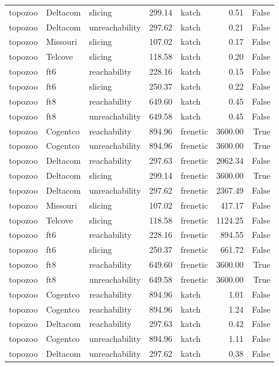 \begin{tabular}{lllrlrr}
topozoo & Deltacom & slicing & 299.14 & katch & 0.51 & False \\
topozoo & Deltacom & unreachability & 297.62 & katch & 0.21 & False \\
topozoo & Missouri & slicing & 107.02 & katch & 0.17 & False \\
topozoo & Telcove & slicing & 118.58 & katch & 0.20 & False \\
topozoo & ft6 & reachability & 228.16 & katch & 0.15 & False \\
topozoo & ft6 & slicing & 250.37 & katch & 0.22 & False \\
topozoo & ft8 & reachability & 649.60 & katch & 0.45 & False \\
topozoo & ft8 & unreachability & 649.58 & katch & 0.45 & False \\
topozoo & Cogentco & reachability & 894.96 & frenetic & 3600.00 & True \\
topozoo & Cogentco & unreachability & 894.96 & frenetic & 3600.00 & True \\
topozoo & Deltacom & reachability & 297.63 & frenetic & 2062.34 & False \\
topozoo & Deltacom & slicing & 299.14 & frenetic & 3600.00 & True \\
topozoo & Deltacom & unreachability & 297.62 & frenetic & 2367.49 & False \\
topozoo & Missouri & slicing & 107.02 & frenetic & 417.17 & False \\
topozoo & Telcove & slicing & 118.58 & frenetic & 1124.25 & False \\
topozoo & ft6 & reachability & 228.16 & frenetic & 894.55 & False \\
topozoo & ft6 & slicing & 250.37 & frenetic & 661.72 & False \\
topozoo & ft8 & reachability & 649.60 & frenetic & 3600.00 & True \\
topozoo & ft8 & unreachability & 649.58 & frenetic & 3600.00 & True \\
topozoo & Cogentco & reachability & 894.96 & katch & 1.01 & False \\
topozoo & Cogentco & reachability & 894.96 & katch & 1.24 & False \\
topozoo & Deltacom & reachability & 297.63 & katch & 0.42 & False \\
topozoo & Cogentco & unreachability & 894.96 & katch & 1.11 & False \\
topozoo & Deltacom & unreachability & 297.62 & katch & 0.38 & False \\

\end{tabular}
